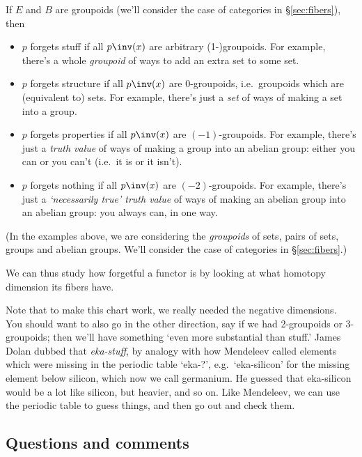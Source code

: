 \documentclass{amsart}
\begin{document}
\begin{fact}\label{forgetfulness-by-fibers}
  If $E$ and $B$ are groupoids (we'll consider the case of categories
  in \S\ref{sec:fibers}), then
  \begin{itemize}
  \item $p$ forgets stuff if all $p\inv(x)$ are arbitrary
    (1-)groupoids.  For example, there's a whole \emph{groupoid} 
    of ways to add an extra set to some set.
  \item $p$ forgets structure if all $p\inv(x)$ are 0-groupoids,
    i.e.\ groupoids which are (equivalent to) sets.  For example, 
    there's just a \emph{set} of ways of making a set into a group.
  \item $p$ forgets properties if all $p\inv(x)$ are $(-1)$-groupoids.
    For example, there's just a \emph{truth value} of ways of making 
    a group into an abelian group: either you can or you can't 
    (i.e.\ it is or it isn't).
  \item $p$ forgets nothing if all $p\inv(x)$ are $(-2)$-groupoids.
For example, there's just a \emph{`necessarily true' truth value} of ways
of making an abelian group into an abelian group: you always can, 
in one way.
  \end{itemize}
(In the examples above, we are considering the \emph{groupoids} of
sets, pairs of sets, groups and abelian groups.
We'll consider the case of categories in \S\ref{sec:fibers}.)
\end{fact}

We can thus study how forgetful a functor is by looking at what
homotopy dimension its fibers have.

Note that to make this chart work, we really needed the negative
dimensions.  You should want to also go in the other direction, say if
we had 2-groupoids or 3-groupoids; then we'll have something `even
more substantial than stuff.'  James Dolan dubbed that \emph{eka-stuff},
by analogy with how Mendeleev called elements which were missing in
the periodic table `eka-?', e.g.\ `eka-silicon' for the missing
element below silicon, which now we call germanium.  He
guessed that eka-silicon would be a lot like silicon, but heavier, and
so on.  Like Mendeleev, we can use the periodic table to guess things,
and then go out and check them.


\subsection{Questions and comments}
\label{sec:questions-comments}
\end{document}
